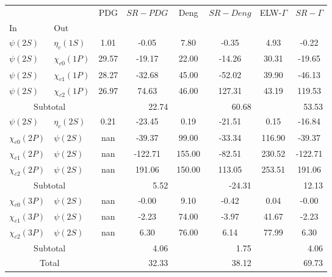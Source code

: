 \begin{tabular}{|l|l|c|c|c|c|c|c|}%
\hline%
&&PDG&$SR-PDG$&Deng&$SR-Deng$&ELW-$\Gamma$&$SR-\Gamma$\\%
In&Out&&&&&&\\%
\hline%
$\psi(2S)$&$\eta_{c}(1S)$&1.01&-0.05&7.80&-0.35&4.93&-0.22\\%
$\psi(2S)$&$\chi_{c0}(1P)$&29.57&-19.17&22.00&-14.26&30.31&-19.65\\%
$\psi(2S)$&$\chi_{c1}(1P)$&28.27&-32.68&45.00&-52.02&39.90&-46.13\\%
$\psi(2S)$&$\chi_{c2}(1P)$&26.97&74.63&46.00&127.31&43.19&119.53\\%
\hline%
\hline%
\multicolumn{2}{|c|}{Subtotal}&\multicolumn{2}{|r|}{22.74}&\multicolumn{2}{|r|}{60.68}&\multicolumn{2}{|r|}{53.53}\\%
\hline%
\hline%
$\psi(2S)$&$\eta_{c}(2S)$&0.21&-23.45&0.19&-21.51&0.15&-16.84\\%
$\chi_{c0}(2P)$&$\psi(2S)$&nan&-39.37&99.00&-33.34&116.90&-39.37\\%
$\chi_{c1}(2P)$&$\psi(2S)$&nan&-122.71&155.00&-82.51&230.52&-122.71\\%
$\chi_{c2}(2P)$&$\psi(2S)$&nan&191.06&150.00&113.05&253.51&191.06\\%
\hline%
\hline%
\multicolumn{2}{|c|}{Subtotal}&\multicolumn{2}{|r|}{5.52}&\multicolumn{2}{|r|}{{-}24.31}&\multicolumn{2}{|r|}{12.13}\\%
\hline%
\hline%
$\chi_{c0}(3P)$&$\psi(2S)$&nan&-0.00&9.10&-0.42&0.04&-0.00\\%
$\chi_{c1}(3P)$&$\psi(2S)$&nan&-2.23&74.00&-3.97&41.67&-2.23\\%
$\chi_{c2}(3P)$&$\psi(2S)$&nan&6.30&76.00&6.14&77.99&6.30\\%
\hline%
\hline%
\multicolumn{2}{|c|}{Subtotal}&\multicolumn{2}{|r|}{4.06}&\multicolumn{2}{|r|}{1.75}&\multicolumn{2}{|r|}{4.06}\\%
\hline%
\hline%
\multicolumn{2}{|c|}{Total}&\multicolumn{2}{|r|}{32.33}&\multicolumn{2}{|r|}{38.12}&\multicolumn{2}{|r|}{69.73}\\%
\hline%
\end{tabular}
